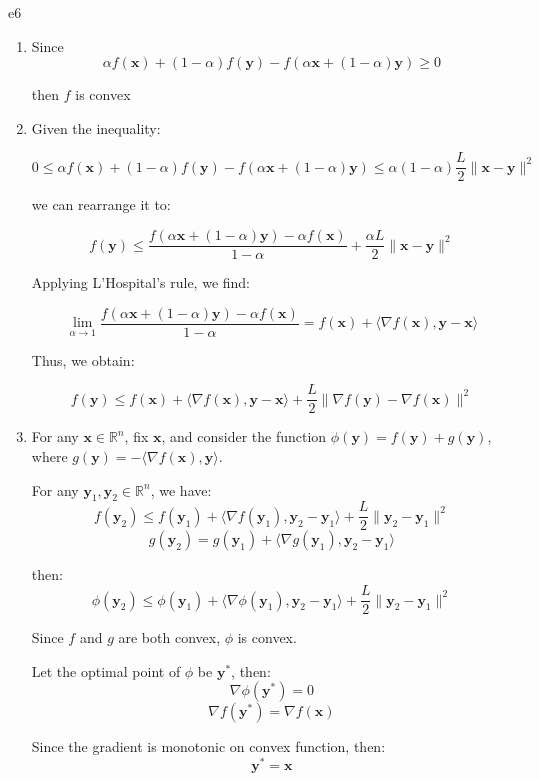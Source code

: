 \documentclass{article}
\newcommand{\xB}{\bm{x}}
\newcommand{\yB}{\bm{y}}
\begin{document}
\begin{PROOF}{e6}
	\begin{enumerate}
		\item Since 
		\[
		\alpha f(\xB) + (1-\alpha) f(\yB) - f(\alpha \xB + (1-\alpha) \yB) \geq 0
		\]
		
		then $f$ is convex
		
		\item Given the inequality:
		
		\[
		0 \leq \alpha f(\xB) + (1-\alpha) f(\yB) - f(\alpha \xB + (1-\alpha) \yB) \leq \alpha (1-\alpha) \frac{L}{2} \|\xB - \yB\|^2
		\]

		we can rearrange it to:

		\[
		f(\yB) \leq \frac{f(\alpha \xB + (1-\alpha) \yB) - \alpha f(\xB)}{1-\alpha} + \frac{\alpha L}{2} \|\xB - \yB\|^2
		\]

		Applying L'Hospital's rule, we find:

		\[
		\lim_{\alpha \to 1} \frac{f(\alpha \xB + (1-\alpha) \yB) - \alpha f(\xB)}{1-\alpha} = f(\xB) + \langle \nabla f(\xB), \yB - \xB \rangle
		\]

		Thus, we obtain:

		\[
		f(\yB) \leq f(\xB) + \langle \nabla f(\xB), \yB - \xB \rangle + \frac{L}{2} \|\nabla f(\yB) - \nabla f(\xB)\|^2
		\]

		\item For any \(\xB \in \mathbb{R}^n \), fix \( \xB \), and consider the function \( \phi(\yB) = f(\yB) + g(\yB) \), where \( g(\yB) = -\langle\nabla f(\xB), \yB\rangle \).

		For any \( \yB_1, \yB_2 \in \mathbb{R}^n \), we have:
		\[
			f(\yB_2) \leq f(\yB_1) + \langle \nabla f(\yB_1), \yB_2 - \yB_1 \rangle + \frac{L}{2} \|\yB_2 - \yB_1\|^2
		\]
		\[
		g(\yB_2) = g(\yB_1) + \langle \nabla g(\yB_1), \yB_2 - \yB_1 \rangle
		\]
		
		then:
		\[
		\phi(\yB_2) \leq \phi(\yB_1) + \langle \nabla \phi(\yB_1), \yB_2 - \yB_1 \rangle + \frac{L}{2} \|\yB_2 - \yB_1\|^2
		\]
		
		Since \( f \) and \( g \) are both convex, \( \phi \) is convex.
		
		Let the optimal point of \( \phi \) be \( \yB^* \), then:
		\[
		\nabla \phi(\yB^*) = 0
		\]
		\[
		\nabla f(\yB^*) = \nabla f(\xB)
		\]
		
		Since the gradient is monotonic on convex function, then:
		\[
		\yB^* = \xB
		\]


\end{enumerate}
\end{PROOF}
\end{document}
